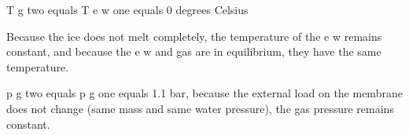 T g two equals T e w one equals 0 degrees Celsius

Because the ice does not melt completely, the temperature of the e w remains constant, and because the e w and gas are in equilibrium, they have the same temperature.

p g two equals p g one equals 1.1 bar, because the external load on the membrane does not change (same mass and same water pressure), the gas pressure remains constant.